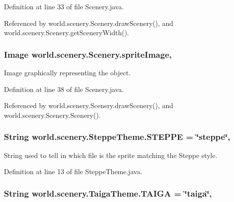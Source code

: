 Definition at line 33 of file Scenery.\-java.



Referenced by world.\-scenery.\-Scenery.\-draw\-Scenery(), and world.\-scenery.\-Scenery.\-get\-Scenery\-Width().

\hypertarget{a00024_a512d9c0a154e6843389e343d80843326}{
\subsubsection[{sprite\-Image}]{\setlength{\rightskip}{0pt plus 5cm}Image world.\-scenery.\-Scenery.\-sprite\-Image\hspace{0.3cm}{\ttfamily [protected]}, {\ttfamily [inherited]}}}\label{a00024_a512d9c0a154e6843389e343d80843326}


Image graphically representing the object. 



Definition at line 38 of file Scenery.\-java.



Referenced by world.\-scenery.\-Scenery.\-draw\-Scenery(), and world.\-scenery.\-Scenery.\-Scenery().

\hypertarget{a00027_a03bdfdc54a3a5d52694b77342ec34e3e}{
\subsubsection[{S\-T\-E\-P\-P\-E}]{\setlength{\rightskip}{0pt plus 5cm}String world.\-scenery.\-Steppe\-Theme.\-S\-T\-E\-P\-P\-E = \char`\"{}steppe\char`\"{}\hspace{0.3cm}{\ttfamily [static]}, {\ttfamily [inherited]}}}\label{a00027_a03bdfdc54a3a5d52694b77342ec34e3e}


String used to tell in which file is the sprite matching the Steppe style. 



Definition at line 13 of file Steppe\-Theme.\-java.

\hypertarget{a00028_ad3418d8f4936efb0ef1e3eb2009a34f0}{
\subsubsection[{T\-A\-I\-G\-A}]{\setlength{\rightskip}{0pt plus 5cm}String world.\-scenery.\-Taiga\-Theme.\-T\-A\-I\-G\-A = \char`\"{}taiga\char`\"{}\hspace{0.3cm}{\ttfamily [static]}, {\ttfamily [inherited]}}}\label{a00028_ad3418d8f4936efb0ef1e3eb2009a34f0}


